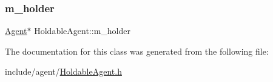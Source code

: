 \mbox{\label{class_holdable_agent_ae9c449c1831f933b5b6b6f71e425279b}} 
\subsubsection{\texorpdfstring{m\+\_\+holder}{m\_holder}}
{\footnotesize\ttfamily \hyperlink{class_agent}{Agent}$\ast$ Holdable\+Agent\+::m\+\_\+holder\hspace{0.3cm}{\ttfamily [private]}}



The documentation for this class was generated from the following file\+:\begin{DoxyCompactItemize}
\item 
include/agent/\hyperlink{_holdable_agent_8h}{Holdable\+Agent.\+h}\end{DoxyCompactItemize}
